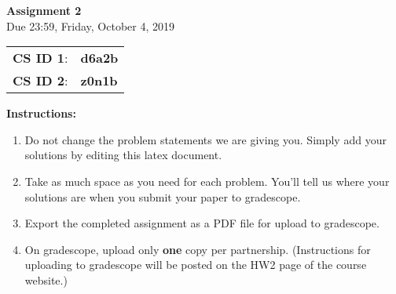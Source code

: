 \documentclass[11pt,table]{article}
\renewcommand{\arraystretch}{2}
\begin{document}

\begin{center}
    \LARGE
    \textbf{Assignment 2}
    \\[1ex]
    \Large Due 23:59, Friday, October 4, 2019 \\
\end{center}

\begin{table}[h]
    \centering
    \renewcommand{\arraystretch}{1.5}
    \begin{tabular}{ll}
        \textbf{CS ID 1}: & \textbf{d6a2b}\\
        \textbf{CS ID 2}: & \textbf{z0n1b}\\
    \end{tabular}
\end{table}

\textbf{Instructions:}
\begin{enumerate}
\item Do not change the problem statements we are giving you. Simply add your solutions by editing this latex document. 
\item Take as much space as you need for each problem. You'll tell us where your solutions are when you submit your paper to gradescope. 
\item Export the completed assignment as a PDF file for upload to gradescope.
\item On gradescope, upload only \textbf{one} copy per partnership. (Instructions for uploading to gradescope will be posted on the HW2 page of the course website.)
\end{enumerate}
\end{document}
